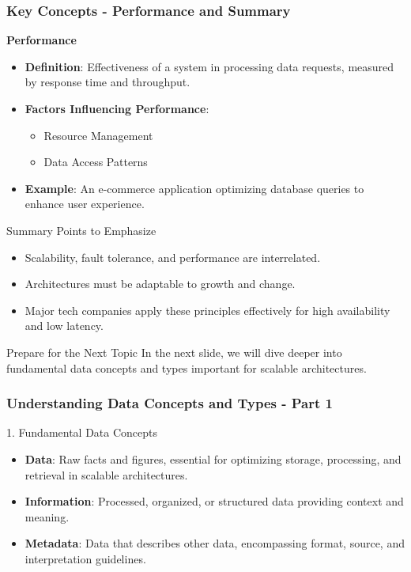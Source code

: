 \documentclass{beamer}
\begin{document}
\begin{frame}[fragile]
    \frametitle{Key Concepts - Performance and Summary}
    
    \textbf{Performance}
    \begin{itemize}
        \item \textbf{Definition}: Effectiveness of a system in processing data requests, measured by response time and throughput.
        \item \textbf{Factors Influencing Performance}:
            \begin{itemize}
                \item Resource Management
                \item Data Access Patterns
            \end{itemize}
        \item \textbf{Example}: An e-commerce application optimizing database queries to enhance user experience.
    \end{itemize}

    \begin{block}{Summary Points to Emphasize}
        \begin{itemize}
            \item Scalability, fault tolerance, and performance are interrelated.
            \item Architectures must be adaptable to growth and change.
            \item Major tech companies apply these principles effectively for high availability and low latency.
        \end{itemize}
    \end{block}

    \begin{block}{Prepare for the Next Topic}
        In the next slide, we will dive deeper into fundamental data concepts and types important for scalable architectures.
    \end{block}
\end{frame}

\begin{frame}[fragile]
    \frametitle{Understanding Data Concepts and Types - Part 1}
    
    \begin{block}{1. Fundamental Data Concepts}
        \begin{itemize}
            \item \textbf{Data}: Raw facts and figures, essential for optimizing storage, processing, and retrieval in scalable architectures.
            \item \textbf{Information}: Processed, organized, or structured data providing context and meaning.
            \item \textbf{Metadata}: Data that describes other data, encompassing format, source, and interpretation guidelines.
        \end{itemize}
    \end{block}
\end{frame}
\end{document}
